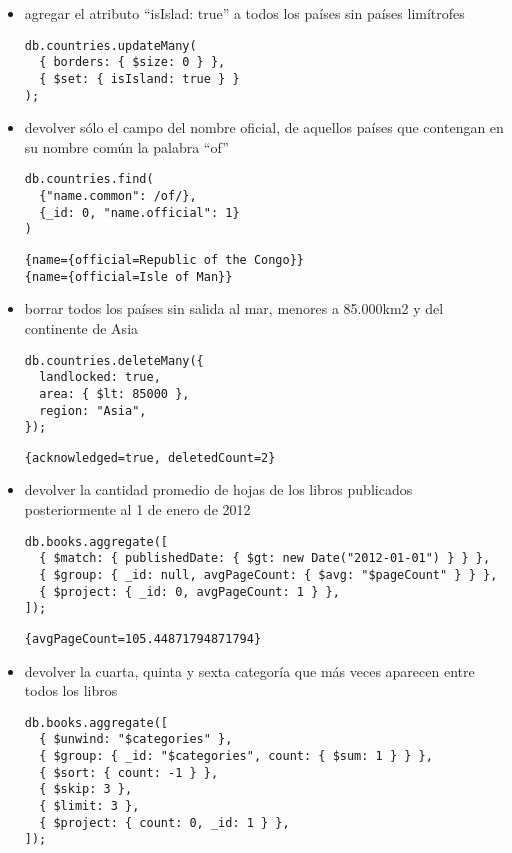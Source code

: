 \documentclass[12pt, a4paper]{article}
\begin{document}

\setcounter{page}{1}

\begin{itemize}
\item agregar el atributo {“isIslad: true”} a todos los países sin países limítrofes
\begin{lstlisting}[frame=single]
db.countries.updateMany(
  { borders: { $size: 0 } },
  { $set: { isIsland: true } }
);
\end{lstlisting}

\item devolver sólo el campo del nombre oficial, de aquellos países que contengan en su nombre común la palabra “of”
\begin{lstlisting}[frame=single]
db.countries.find(
  {"name.common": /of/},
  {_id: 0, "name.official": 1}
)
\end{lstlisting}

\begin{lstlisting}[frame=shadowbox]
{name={official=Republic of the Congo}}
{name={official=Isle of Man}}
\end{lstlisting}

\item  borrar todos los países sin salida al mar, menores a 85.000km2 y del continente de Asia
\begin{lstlisting}[frame=single]
db.countries.deleteMany({
  landlocked: true,
  area: { $lt: 85000 },
  region: "Asia",
});
\end{lstlisting}

\begin{lstlisting}[frame=shadowbox]
{acknowledged=true, deletedCount=2}
\end{lstlisting}

\hrulefill

\item  devolver la cantidad promedio de hojas de los libros publicados posteriormente al 1 de enero de 2012
\begin{lstlisting}[frame=single]
db.books.aggregate([
  { $match: { publishedDate: { $gt: new Date("2012-01-01") } } },
  { $group: { _id: null, avgPageCount: { $avg: "$pageCount" } } },
  { $project: { _id: 0, avgPageCount: 1 } },
]);
\end{lstlisting}

\begin{lstlisting}[frame=shadowbox]
{avgPageCount=105.44871794871794}
\end{lstlisting}

\item  devolver la cuarta, quinta y sexta categoría que más veces aparecen entre todos los libros
\begin{lstlisting}[frame=single]
db.books.aggregate([
  { $unwind: "$categories" },
  { $group: { _id: "$categories", count: { $sum: 1 } } },
  { $sort: { count: -1 } },
  { $skip: 3 },
  { $limit: 3 },
  { $project: { count: 0, _id: 1 } },
]);
\end{lstlisting}


\end{itemize}
\end{document}
